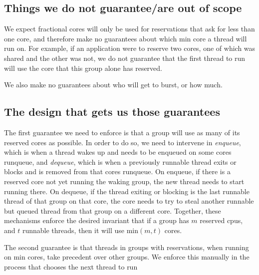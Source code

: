 
\subsection{Things we do not guarantee/are out of scope}

We expect fractional cores will only be used for reservations that ask for less
than one core, and therefore make no guarantees about which min core a thread
will run on. For example, if an application were to reserve two cores, one of
which was shared and the other was not, we do not guarantee that the first
thread to run will use the core that this group alone has reserved.

We also make no guarantees about who will get to burst, or how much.

\subsection{The design that gets us those guarantees}


The first guarantee we need to enforce is that a group will use as many of its
reserved cores as possible. In order to do so, we need to intervene in
\textit{enqueue}, which is when a thread wakes up and needs to be enqueued on
some cores runqueue, and \textit{dequeue}, which is when a previously runnable
thread exits or blocks and is removed from that cores runqueue. On enqueue, if
there is a reserved core not yet running the waking group, the new thread needs
to start running there. On dequeue, if the thread exiting or blocking is the
last runnable thread of that group on that core, the core needs to try to steal
another runnable but queued thread from that group on a different core.
Together, these mechanisms enforce the desired invariant that if a group has $m$
reserved cpus, and $t$ runnable threads, then it will use min$(m,t)$ cores.


The second guarantee is that threads in groups with reservations, when running
on min cores, take precedent over other groups. We enforce this manually in the
process that chooses the next thread to run 

